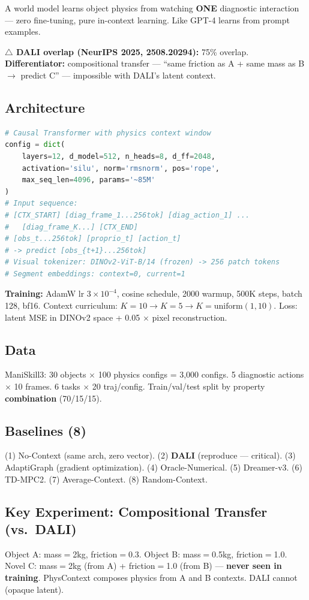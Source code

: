 \documentclass[11pt,a4paper]{article}
\begin{document}
A world model learns object physics from watching \textbf{ONE} diagnostic interaction --- zero fine-tuning, pure in-context learning. Like GPT-4 learns from prompt examples.

\textbf{$\triangle$ DALI overlap (NeurIPS 2025, 2508.20294):} 75\% overlap. \textbf{Differentiator:} compositional transfer --- ``same friction as A + same mass as B $\to$ predict C'' --- impossible with DALI's latent context.

\subsection{Architecture}

\begin{lstlisting}[language=Python, caption=PhysContext Transformer]
# Causal Transformer with physics context window
config = dict(
    layers=12, d_model=512, n_heads=8, d_ff=2048,
    activation='silu', norm='rmsnorm', pos='rope',
    max_seq_len=4096, params='~85M'
)
# Input sequence:
# [CTX_START] [diag_frame_1...256tok] [diag_action_1] ...
#   [diag_frame_K...] [CTX_END]
# [obs_t...256tok] [proprio_t] [action_t]
# -> predict [obs_{t+1}...256tok]
# Visual tokenizer: DINOv2-ViT-B/14 (frozen) -> 256 patch tokens
# Segment embeddings: context=0, current=1
\end{lstlisting}

\textbf{Training:} AdamW lr $3{\times}10^{-4}$, cosine schedule, 2000 warmup, 500K steps, batch 128, bf16. Context curriculum: $K{=}10 \to K{=}5 \to K{=}\text{uniform}(1,10)$. Loss: latent MSE in DINOv2 space + 0.05 $\times$ pixel reconstruction.

\subsection{Data}
ManiSkill3: 30 objects $\times$ 100 physics configs = 3,000 configs. 5 diagnostic actions $\times$ 10 frames. 6 tasks $\times$ 20 traj/config. Train/val/test split by property \textbf{combination} (70/15/15).

\subsection{Baselines (8)}
(1) No-Context (same arch, zero vector). (2) \textbf{DALI} (reproduce --- critical). (3) AdaptiGraph (gradient optimization). (4) Oracle-Numerical. (5) Dreamer-v3. (6) TD-MPC2. (7) Average-Context. (8) Random-Context.

\subsection{Key Experiment: Compositional Transfer (vs.\ DALI)}
Object A: mass$=$2kg, friction$=$0.3. Object B: mass$=$0.5kg, friction$=$1.0. Novel C: mass$=$2kg (from A) + friction$=$1.0 (from B) --- \textbf{never seen in training}. PhysContext composes physics from A and B contexts. DALI cannot (opaque latent).
\end{document}
